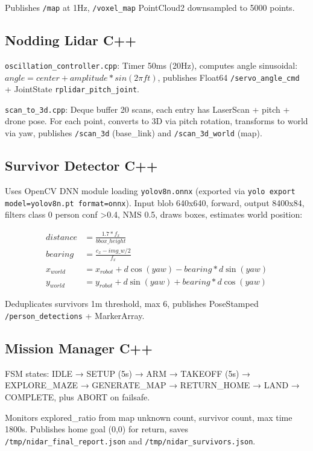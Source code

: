 \documentclass[12pt,a4paper]{article}
\begin{document}
Publishes \texttt{/map} at 1Hz, \texttt{/voxel\_map} PointCloud2 downsampled to 5000 points.

\subsection{Nodding Lidar C++}

\texttt{oscillation\_controller.cpp}: Timer 50ms (20Hz), computes angle sinusoidal: $angle = center + amplitude * sin(2\pi f t)$, publishes Float64 \texttt{/servo\_angle\_cmd} + JointState \texttt{rplidar\_pitch\_joint}.

\texttt{scan\_to\_3d.cpp}: Deque buffer 20 scans, each entry has LaserScan + pitch + drone pose. For each point, converts to 3D via pitch rotation, transforms to world via yaw, publishes \texttt{/scan\_3d} (base\_link) and \texttt{/scan\_3d\_world} (map).

\subsection{Survivor Detector C++}

Uses OpenCV DNN module loading \texttt{yolov8n.onnx} (exported via \texttt{yolo export model=yolov8n.pt format=onnx}). Input blob 640x640, forward, output 8400x84, filters class 0 person conf >0.4, NMS 0.5, draws boxes, estimates world position:

\begin{align}
distance &= \frac{1.7 * f_x}{bbox\_height} \\
bearing &= \frac{c_x - img\_w/2}{f_x} \\
x_{world} &= x_{robot} + d \cos(yaw) - bearing * d \sin(yaw) \\
y_{world} &= y_{robot} + d \sin(yaw) + bearing * d \cos(yaw)
\end{align}

Deduplicates survivors 1m threshold, max 6, publishes PoseStamped \texttt{/person\_detections} + MarkerArray.

\subsection{Mission Manager C++}

FSM states: IDLE → SETUP (5s) → ARM → TAKEOFF (5s) → EXPLORE\_MAZE → GENERATE\_MAP → RETURN\_HOME → LAND → COMPLETE, plus ABORT on failsafe.

Monitors explored\_ratio from map unknown count, survivor count, max time 1800s. Publishes home goal (0,0) for return, saves \texttt{/tmp/nidar\_final\_report.json} and \texttt{/tmp/nidar\_survivors.json}.
\end{document}
